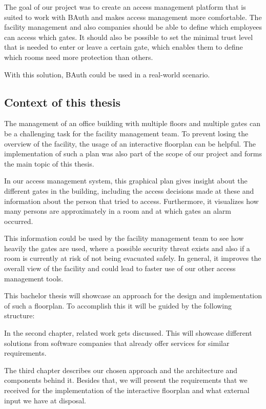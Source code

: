 The goal of our project was to create an access management platform that is suited to work with BAuth and makes access management more comfortable. The facility management and also companies should be able to define which employees can access which gates. It should also be possible to set the minimal trust level that is needed to enter or leave a certain gate, which enables them to define which rooms need more protection than others.

With this solution, BAuth could be used in a real-world scenario.

\subsection{Context of this thesis}
\label{Context of this thesis}


The management of an office building with multiple floors and multiple gates can be a challenging task for the facility management team. To prevent losing the overview of the facility, the usage of an interactive floorplan can be helpful. The implementation of such a plan was also part of the scope of our project and forms the main topic of this thesis.

In our access management system, this graphical plan gives insight about the different gates in the building, including the access decisions made at these and information about the person that tried to access. Furthermore, it visualizes how many persons are approximately in a room and at which gates an alarm occurred. 

This information could be used by the facility management team to see how heavily the gates are used, where a possible security threat exists and also if a room is currently at risk of not being evacuated safely. 
In general, it improves the overall view of the facility and could lead to faster use of our other access management tools.

This bachelor thesis will showcase an approach for the design and implementation of such a floorplan. To accomplish this it will be guided by the following structure:

In the second chapter, related work gets discussed. This will showcase different solutions from software companies that already offer services for similar requirements.

The third chapter describes our chosen approach and the architecture and components behind it. Besides that, we will present the requirements that we received for the implementation of the interactive floorplan and what external input we have at disposal.

